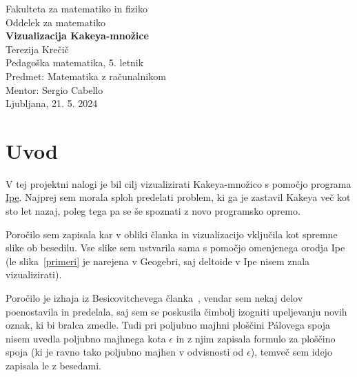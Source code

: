 \documentclass[a4paper, 12pt]{article}
\begin{document}
\begin{titlepage}
    \begin{center}
        \large
        Fakulteta za matematiko in fiziko\\
        Oddelek za matematiko \\
        \vspace{6cm}
        \Huge
        \textbf{Vizualizacija Kakeya-množice} \\
        \vspace{6cm}
        \large
        Terezija Krečič\\
        Pedagoška matematika, 5. letnik\\
        \vspace{1cm}
        Predmet: Matematika z računalnikom \\
        Mentor: Sergio Cabello\\
        \vspace{2cm}
        Ljubljana, 21. 5. 2024
    \end{center}
\end{titlepage}

\newpage



\section*{Uvod}

V tej projektni nalogi je bil cilj vizualizirati Kakeya-množico s pomočjo programa \href{https://ipe.otfried.org/}{Ipe}. Najprej sem morala sploh predelati problem, ki ga je zastavil Kakeya več kot sto let nazaj, poleg tega pa se še spoznati z novo programsko opremo.

Poročilo sem zapisala kar v obliki članka in vizualizacijo vključila kot spremne slike ob besedilu. Vse slike sem ustvarila sama s pomočjo omenjenega orodja Ipe (le slika~\ref{primeri} je narejena v Geogebri, saj deltoide v Ipe nisem znala vizualizirati).

Poročilo je izhaja iz Besicovitchevega članka~\cite{Besicovitch}, vendar sem nekaj delov poenostavila in predelala, saj sem se poskusila čimbolj izogniti upeljevanju novih oznak, ki bi bralca zmedle. Tudi pri poljubno majhni ploščini Pálovega spoja nisem uvedla poljubno majhnega kota $ \epsilon $ in z njim zapisala formulo za ploščino spoja (ki je ravno tako poljubno majhen v odvisnosti od $ \epsilon $), temveč sem idejo zapisala le z besedami.
\end{document}
